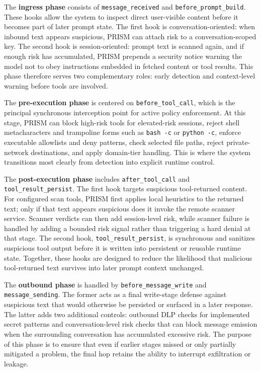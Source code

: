 The \textbf{ingress phase} consists of \texttt{message\_received} and \texttt{before\_prompt\_build}. These hooks allow the system to inspect direct user-visible content before it becomes part of later prompt state. The first hook is conversation-oriented: when inbound text appears suspicious, PRISM can attach risk to a conversation-scoped key. The second hook is session-oriented: prompt text is scanned again, and if enough risk has accumulated, PRISM prepends a security notice warning the model not to obey instructions embedded in fetched content or tool results. This phase therefore serves two complementary roles: early detection and context-level warning before tools are involved.

The \textbf{pre-execution phase} is centered on \texttt{before\_tool\_call}, which is the principal synchronous interception point for active policy enforcement. At this stage, PRISM can block high-risk tools for elevated-risk sessions, reject shell metacharacters and trampoline forms such as \texttt{bash -c} or \texttt{python -c}, enforce executable allowlists and deny patterns, check selected file paths, reject private-network destinations, and apply domain-tier handling. This is where the system transitions most clearly from detection into explicit runtime control.

The \textbf{post-execution phase} includes \texttt{after\_tool\_call} and \texttt{tool\_result\_persist}. The first hook targets suspicious tool-returned content. For configured scan tools, PRISM first applies local heuristics to the returned text; only if that text appears suspicious does it invoke the remote scanner service. Scanner verdicts can then add session-level risk, while scanner failure is handled by adding a bounded risk signal rather than triggering a hard denial at that stage. The second hook, \texttt{tool\_result\_persist}, is synchronous and sanitizes suspicious tool output before it is written into persistent or reusable runtime state. Together, these hooks are designed to reduce the likelihood that malicious tool-returned text survives into later prompt context unchanged.

The \textbf{outbound phase} is handled by \texttt{before\_message\_write} and \texttt{message\_sending}. The former acts as a final write-stage defense against suspicious text that would otherwise be persisted or surfaced in a later response. The latter adds two additional controls: outbound DLP checks for implemented secret patterns and conversation-level risk checks that can block message emission when the surrounding conversation has accumulated excessive risk. The purpose of this phase is to ensure that even if earlier stages missed or only partially mitigated a problem, the final hop retains the ability to interrupt exfiltration or leakage.

